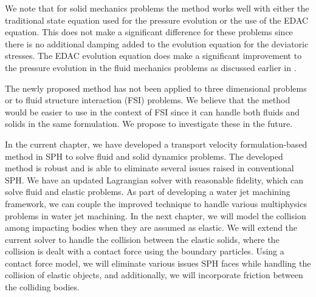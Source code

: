 We note that for solid mechanics problems the method works well with either
the traditional state equation used for the pressure evolution or the use of
the EDAC equation. This does not make a significant difference for these
problems since there is no additional damping added to the evolution equation
for the deviatoric stresses. The EDAC evolution equation does make a
significant improvement to the pressure evolution in the fluid mechanics
problems as discussed earlier in \citep{edac-sph:cf:2019}.

The newly proposed method has not been applied to three dimensional problems
or to fluid structure interaction (FSI) problems. We believe that the method
would be easier to use in the context of FSI since it can handle both fluids
and solids in the same formulation. We propose to investigate these in the
future.


In the current chapter, we have developed a transport velocity formulation-based
method in SPH to solve fluid and solid dynamics problems. The developed method
is robust and is able to eliminate several issues raised in conventional SPH. We
have an updated Lagrangian solver with reasonable fidelity, which can solve
fluid and elastic problems. As part of developing a water jet machining
framework, we can couple the improved technique to handle various multiphysics
problems in water jet machining. In the next chapter, we will model the
collision among impacting bodies when they are assumed as elastic. We will
extend the current solver to handle the collision between the elastic solids,
where the collision is dealt with a contact force using the boundary particles.
Using a contact force model, we will eliminate various issues SPH faces while
handling the collision of elastic objects, and additionally, we will incorporate
friction between the colliding bodies.
